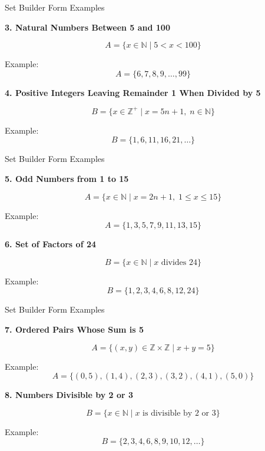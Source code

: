 \documentclass{beamer}
\begin{document}
\begin{frame}{Set Builder Form Examples}

\textbf{3. Natural Numbers Between 5 and 100}

\[
A=\{x\in\mathbb{N}\mid 5<x<100\}
\]

Example:
\[
A=\{6,7,8,9,\ldots,99\}
\]

\vspace{0.4cm}

\textbf{4. Positive Integers Leaving Remainder 1 When Divided by 5}

\[
B=\{x\in\mathbb{Z}^{+}\mid x=5n+1,\; n\in\mathbb{N}\}
\]

Example:
\[
B=\{1,6,11,16,21,\ldots\}
\]

\end{frame}

\begin{frame}{Set Builder Form Examples}

\textbf{5. Odd Numbers from 1 to 15}

\[
A=\{x\in\mathbb{N}\mid x=2n+1,\;1\leq x\leq15\}
\]

Example:
\[
A=\{1,3,5,7,9,11,13,15\}
\]

\vspace{0.4cm}

\textbf{6. Set of Factors of 24}

\[
B=\{x\in\mathbb{N}\mid x \text{ divides } 24\}
\]

Example:
\[
B=\{1,2,3,4,6,8,12,24\}
\]

\end{frame}

\begin{frame}{Set Builder Form Examples}

\textbf{7. Ordered Pairs Whose Sum is 5}

\[
A=\{(x,y)\in\mathbb{Z}\times\mathbb{Z}\mid x+y=5\}
\]

Example:
\[
A=\{(0,5),(1,4),(2,3),(3,2),(4,1),(5,0)\}
\]

\vspace{0.4cm}

\textbf{8. Numbers Divisible by 2 or 3}

\[
B=\{x\in\mathbb{N}\mid x\text{ is divisible by }2
\text{ or }3\}
\]

Example:
\[
B=\{2,3,4,6,8,9,10,12,\ldots\}
\]

\end{frame}
\end{document}
